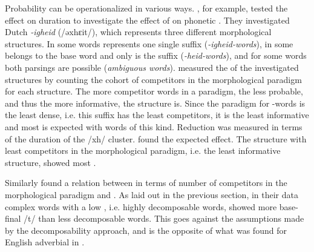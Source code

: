  
 Probability can be operationalized in various ways. 
   \cite{Pluymaekers.2010}, for example, tested the effect  on duration to investigate the effect of  on phonetic .
 They investigated Dutch \textit{-igheid} (/əxhɛit/), which represents three different morphological structures. In some words  represents one single suffix (\textit{\textit{-igheid}-words}), in some  belongs to the base word and only  is the suffix (\textit{-heid-words}), and for some words both parsings are possible (\textit{ambiguous words}). \cite{Pluymaekers.2010} measured the  of the investigated structures by counting the cohort of competitors in the morphological paradigm for each structure. 
 The more competitor words in a paradigm, the less probable, and thus the more informative, the structure is.  Since the paradigm for -words is the least dense, i.e. this suffix has the least competitors, it is the least informative and most  is expected with words of this kind. Reduction was measured in terms of the duration of the /xh/ cluster. \cite{Pluymaekers.2010} found the expected effect. The structure with least competitors in the morphological paradigm, i.e. the least informative structure, showed most .
  
  
 Similarly \cite{Schuppler.2012} found a relation between  in terms of number of competitors in the morphological paradigm and . 
 As laid out in the previous section, in their data complex words with a low , i.e. highly decomposable words, showed more base-final /t/  than less decomposable words. This goes against the assumptions made by the decomposability approach, and is the opposite of what was found for English adverbial  in \cite{Hay.2003}. 
 
